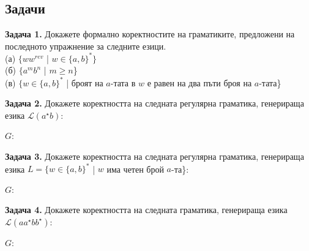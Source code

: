 \documentclass[openany]{book}
\begin{document}
\subsection{Задачи}
    \textbf{Задача 1.} Докажете формално коректностите на граматиките, предложени на 
    последното упражнение за следните езици. \\
    (а) $\{ww^{rev}$ | $w \in \{a,b\}^*\}$ \\
    (б) $\{a^mb^n$ | $m \geq n$\} \\
    (в) $\{w \in \{a,b\}^*$ | броят на $a$-тата в $w$ е равен на два пъти броя на $a$-тата\}

    \vspace{15pt}

    \textbf{Задача 2.} Докажете коректността на следната регулярна граматика, генерираща
    езика $\mathscr{L}(a^{\star}b)$: \\
    \begin{center}
        $G$: 
    \end{center}

    \vspace{15pt}

    \textbf{Задача 3.} Докажете коректността на следната регулярна граматика, генерираща
    езика $L = \{w \in \{a,b\}^*$ | $w$ има четен брой $a$-та\}: \\
    \begin{center}
        $G$: 
    \end{center}

    \vspace{15pt}

    \textbf{Задача 4.} Докажете коректността на следната граматика, генерираща
    езика $\mathscr{L}(aa^{\star}bb^{\star})$: \\
    \begin{center}
        $G$: 
    \end{center}
\end{document}
